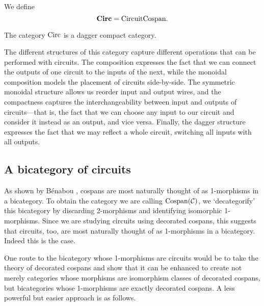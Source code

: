\begin{definition}
  We define
  \[
    \mbox{{\bf \boldmath Circ}} = \mathrm{CircuitCospan} .
  \]
\end{definition}

\begin{corollary}
The category $\mathrm{Circ}$ is a dagger compact category. 
\end{corollary}

The different structures of this category capture different operations that can
be performed with circuits. The composition expresses the fact that we can
connect the outputs of one circuit to the inputs of the next, while the monoidal
composition models the placement of circuits side-by-side. The symmetric
monoidal structure allows us reorder input and output wires, and the compactness
captures the interchangeability between input and outputs of
circuits---that is, the fact that we can choose any input to our
circuit and consider it instead as an output, and vice versa.  Finally, the
dagger structure expresses the fact that we may reflect a whole circuit, switching
all inputs with all outputs.

\subsection{A bicategory of circuits}

As shown by B\'enabou \cite{Be}, cospans are most naturally thought of as
1-morphisms in a bicategory.  To obtain the category we are calling
$\mathrm{Cospan}(\mathcal C)$, we `decategorify' this bicategory by discarding
2-morphisms and identifying isomorphic 1-morphisms. Since we are studying
circuits using decorated cospans, this suggests that circuits, too, are most
naturally thought of as 1-morphisms in a bicategory.  Indeed this is the case.  

One route to the bicategory whose 1-morphisms are circuits would be to take
the theory of decorated cospans \cite{Fon} and show that it can be enhanced to
create not merely categories whose morphisms are isomorphism classes of
decorated cospans, but bicategories whose 1-morphisms are exactly decorated
cospans.  A less powerful but easier approach is as follows.

